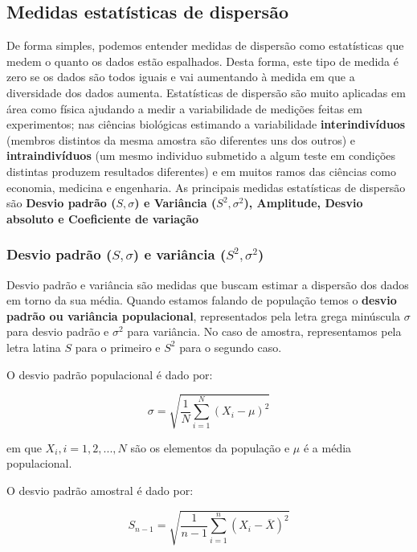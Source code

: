 \documentclass[12pt,]{style/krantz}
\theoremstyle{definition}
\theoremstyle{definition}
\theoremstyle{definition}
\theoremstyle{remark}
\begin{document}
\subsection{Medidas estatísticas de
dispersão}\label{medidas-estatisticas-de-dispersao}

De forma simples, podemos entender medidas de dispersão como
estatísticas que medem o quanto os dados estão espalhados. Desta forma,
este tipo de medida é zero se os dados são todos iguais e vai aumentando
à medida em que a diversidade dos dados aumenta. Estatísticas de
dispersão são muito aplicadas em área como física ajudando a medir a
variabilidade de medições feitas em experimentos; nas ciências
biológicas estimando a variabilidade \textbf{interindivíduos} (membros
distintos da mesma amostra são diferentes uns dos outros) e
\textbf{intraindivíduos} (um mesmo individuo submetido a algum teste em
condições distintas produzem resultados diferentes) e em muitos ramos
das ciências como economia, medicina e engenharia. As principais medidas
estatísticas de dispersão são \textbf{Desvio padrão (\(S,\sigma\)) e
Variância (\(S^2,\sigma^2\)), Amplitude, Desvio absoluto e Coeficiente
de variação}

\subsubsection{\texorpdfstring{Desvio padrão (\(S,\sigma\)) e variância
(\(S^2,\sigma^2\))}{Desvio padrão (S,\textbackslash{}sigma) e variância (S\^{}2,\textbackslash{}sigma\^{}2)}}\label{desvio-padrao-ssigma-e-variancia-s2sigma2}

Desvio padrão e variância são medidas que buscam estimar a dispersão dos
dados em torno da sua média. Quando estamos falando de população temos o
\textbf{desvio padrão ou variância populacional}, representados pela
letra grega minúscula \(\sigma\) para desvio padrão e \(\sigma^2\) para
variância. No caso de amostra, representamos pela letra latina \(S\)
para o primeiro e \(S^2\) para o segundo caso.

O desvio padrão populacional é dado por:

\[{\displaystyle \sigma ={\sqrt {{\frac {1}{N}}\sum _{i=1}^{N}(X_{i}-\mu )^{2}}}}\]

em que \(X_i,i=1,2,...,N\) são os elementos da população e \(\mu\) é a
média populacional.

O desvio padrão amostral é dado por:

\[{\displaystyle S_{n-1}={\sqrt {{\frac {1}{n-1}}\sum _{i=1}^{n}(X_{i}-{\overline {X}})^{2}}}}\]
\end{document}
